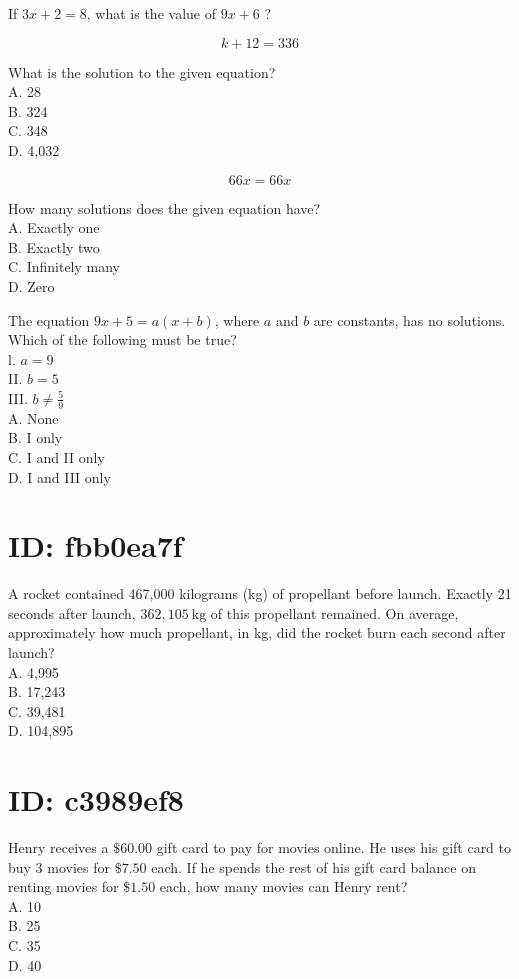 If $3 x+2=8$, what is the value of $9 x+6$ ?

$$
k+12=336
$$

What is the solution to the given equation?\\
A. 28\\
B. 324\\
C. 348\\
D. 4,032

$$
66 x=66 x
$$

How many solutions does the given equation have?\\
A. Exactly one\\
B. Exactly two\\
C. Infinitely many\\
D. Zero

The equation $9 x+5=a(x+b)$, where $a$ and $b$ are constants, has no solutions. Which of the following must be true?\\
l. $a=9$\\
II. $b=5$\\
III. $b \neq \frac{5}{9}$\\
A. None\\
B. I only\\
C. I and II only\\
D. I and III only

\section*{ID: fbb0ea7f}
A rocket contained 467,000 kilograms (kg) of propellant before launch. Exactly 21 seconds after launch, $362,105 \mathrm{~kg}$ of this propellant remained. On average, approximately how much propellant, in kg, did the rocket burn each second after launch?\\
A. 4,995\\
B. 17,243\\
C. 39,481\\
D. 104,895

\section*{ID: c3989ef8}
Henry receives a $\$ 60.00$ gift card to pay for movies online. He uses his gift card to buy 3 movies for $\$ 7.50$ each. If he spends the rest of his gift card balance on renting movies for $\$ 1.50$ each, how many movies can Henry rent?\\
A. 10\\
B. 25\\
C. 35\\
D. 40

